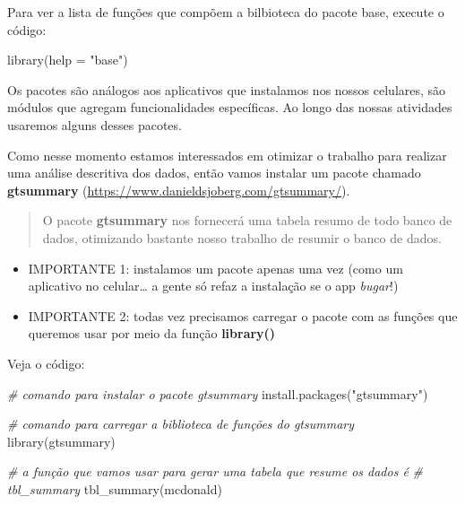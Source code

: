 \documentclass[
]{book}
\newenvironment{Shaded}{\begin{snugshade}}{\end{snugshade}}
\newcommand{\AttributeTok}[1]{\textcolor[rgb]{0.77,0.63,0.00}{#1}}
\newcommand{\CommentTok}[1]{\textcolor[rgb]{0.56,0.35,0.01}{\textit{#1}}}
\newcommand{\FunctionTok}[1]{\textcolor[rgb]{0.00,0.00,0.00}{#1}}
\newcommand{\NormalTok}[1]{#1}
\newcommand{\StringTok}[1]{\textcolor[rgb]{0.31,0.60,0.02}{#1}}
\begin{document}
Para ver a lista de funções que compõem a bilbioteca do pacote base, execute o código:

\begin{Shaded}
\begin{Highlighting}[]
\FunctionTok{library}\NormalTok{(}\AttributeTok{help =} \StringTok{"base"}\NormalTok{)}
\end{Highlighting}
\end{Shaded}

Os pacotes são análogos aos aplicativos que instalamos nos nossos celulares, são módulos que agregam funcionalidades específicas. Ao longo das nossas atividades usaremos alguns desses pacotes.

Como nesse momento estamos interessados em otimizar o trabalho para realizar uma análise descritiva dos dados, então vamos instalar um pacote chamado \textbf{gtsummary} (\url{https://www.danieldsjoberg.com/gtsummary/}).

\begin{quote}
O pacote \textbf{gtsummary} nos fornecerá uma tabela resumo de todo banco de dados, otimizando bastante nosso trabalho de resumir o banco de dados.
\end{quote}

\begin{itemize}
\item
  IMPORTANTE 1: instalamos um pacote apenas uma vez (como um aplicativo no celular\ldots{} a gente só refaz a instalação se o app \emph{bugar}!)
\item
  IMPORTANTE 2: todas vez precisamos carregar o pacote com as funções que queremos usar por meio da função \textbf{library()}
\end{itemize}

Veja o código:

\begin{Shaded}
\begin{Highlighting}[]
\CommentTok{\# comando para instalar o pacote gtsummary}
\FunctionTok{install.packages}\NormalTok{(}\StringTok{"gtsummary"}\NormalTok{)}

\CommentTok{\# comando para carregar a biblioteca de funções do gtsummary}
\FunctionTok{library}\NormalTok{(gtsummary)}

\CommentTok{\# a função que vamos usar para gerar uma tabela que resume os dados é}
\CommentTok{\# tbl\_summary}
\FunctionTok{tbl\_summary}\NormalTok{(mcdonald)}
\end{Highlighting}
\end{Shaded}
\end{document}
